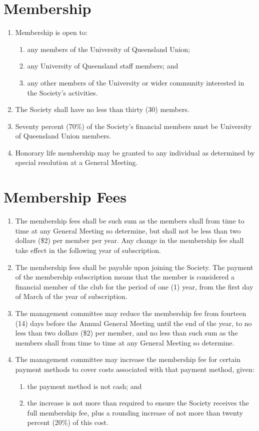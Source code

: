 \documentclass[a4paper]{article}
\begin{document}
\section{Membership}
\begin{enumerate}
\item Membership is open to:
	\begin{enumerate}
	\item any members of the University of Queensland Union;
	\item any University of Queensland staff members; and
	\item any other members of the University or wider community interested in the Society's activities.
	\end{enumerate}
\item The Society shall have no less than thirty (30) members.
\item Seventy percent (70\%) of the Society's financial members must be University of Queensland Union members.
\item Honorary life membership may be granted to any individual as determined by special resolution at a General Meeting.
\end{enumerate}

\section{Membership Fees}
\begin{enumerate}
\item The membership fees shall be such sum as the members shall from time to time at any General Meeting so determine, but shall not be less than two dollars (\$2) per member per year. Any change in the membership fee shall take effect in the following year of subscription.
\item The membership fees shall be payable upon joining the Society. The payment of the membership subscription means that the member is considered a financial member of the club for the period of one (1) year, from the first day of March of the year of subscription.
\item The management committee may reduce the membership fee from fourteen (14) days before the Annual General Meeting until the end of the year, to no less than two dollars (\$2) per member, and no less than such sum as the members shall from time to time at any General Meeting so determine.
\item The management committee may increase the membership fee for certain payment methods to cover costs associated with that payment method, given:
	\begin{enumerate}
	\item the payment method is not cash; and
	\item the increase is not more than required to ensure the Society receives the full membership fee, plus a rounding increase of not more than twenty percent (20\%) of this cost.
	\end{enumerate}
\end{enumerate}
\end{document}
